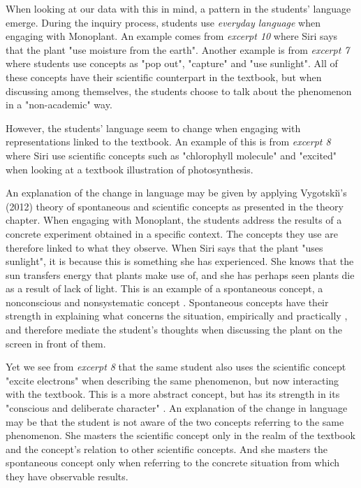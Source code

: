 When looking at our data with this in mind, a pattern in the students' language emerge. During the inquiry process, students use \emph{everyday language} when engaging with Monoplant. An example comes from \emph{excerpt 10} where Siri says that the plant "use moisture from the earth". Another example is from \emph{excerpt 7} where students use concepts as "pop out", "capture" and "use sunlight". All of these concepts have their scientific counterpart in the textbook, but when discussing among themselves, the students choose to talk about the phenomenon in a "non-academic" way. 

However, the students' language seem to change when engaging with representations linked to the textbook. An example of this is from \emph{excerpt 8} where Siri use scientific concepts such as "chlorophyll molecule" and "excited" when looking at a textbook illustration of photosynthesis. 

An explanation of the change in language may be given by applying Vygotski{\u\i}'s (2012) theory of spontaneous and scientific concepts as presented in the theory chapter. When engaging with Monoplant, the students address the results of a concrete experiment obtained in a specific context. The concepts they use are therefore linked to what they observe. When Siri says that the plant "uses sunlight", it is because this is something she has experienced. She knows that the sun transfers energy that plants make use of, and she has perhaps seen plants die as a result of lack of light. This is an example of a spontaneous concept, a nonconscious and nonsystematic concept \citep{vygotsky2012thought}. Spontaneous concepts have their strength in explaining what concerns the situation, empirically and practically \citep{vygotsky2012thought}, and  therefore mediate the student's thoughts when discussing the plant on the screen in front of them. 


Yet we see from \emph{excerpt 8} that the same student also uses the scientific concept "excite electrons" when describing the same phenomenon, but now interacting with the textbook. This is a more abstract concept, but has its strength in its "conscious and deliberate character" \citep[p. 194]{vygotsky2012thought}. An explanation of the change in language may be that the student is not aware of the two concepts referring to the same phenomenon. She masters the scientific concept only in the realm of the textbook and the concept's relation to other scientific concepts. And she masters the spontaneous concept only when referring to the concrete situation from which they have observable results. 


